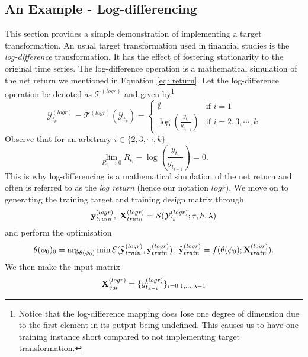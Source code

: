 \subsection{An Example - Log-differencing}\label{subsec: log-diff transformation}
This section provides a simple demonstration of implementing a target transformation. An usual target transformation used in financial studies is the \textit{log-difference} transformation. It has the effect of fostering stationarity to the original time series. The log-difference operation is a mathematical simulation of the net return we mentioned in Equation \ref{eq: return}. Let the log-difference operation be denoted as $\mathcal{T}^{(logr)}$ and given by\footnote{Notice that the log-difference mapping does lose one degree of dimension due to the first element in its output being undefined. This causes us to have one training instance short compared to not implementing target transformation.}
\begin{equation}\label{eq: log-differencing}
    \mathcal{Y}^{(logr)}_{t_k} = \mathcal{T}^{(logr)}(\mathcal{Y}_{t_k}) = \begin{cases}
        \emptyset                  &\text{if $i = 1$} \\
        \log(\frac{y_{t_i}}{y_{t_{i-1}}})  &\text{if $i = 2, 3, \cdots, k$}
    \end{cases}
\end{equation}
Observe that for an arbitrary $i \in \{2, 3, \cdots, k \}$
\begin{equation*}
    \lim_{R_{t_i} \rightarrow 0}{R_{t_i} - \log(\frac{y_{t_i}}{y_{t_{i-1}}}) = 0}.
\end{equation*}
This is why log-differencing is a mathematical simulation of the net return and often is referred to as the \textit{log return} (hence our notation $logr$). We move on to generating the training target and training design matrix through
\begin{equation*}
    \mathbf{y}^{(logr)}_{train}, \; \mathbf{X}^{(logr)}_{train} = \mathcal{S}(\mathcal{Y}^{(logr)}_{t_k}; \tau, h, \lambda)
\end{equation*}
and perform the optimisation
\begin{equation*}
    \theta(\phi_0)_0 = \arg_{\theta(\phi_0)} \min \mathcal{E}(\widehat{\mathbf{y}}^{(logr)}_{train}, \mathbf{y}^{(logr)}_{train}), \; \widehat{\mathbf{y}}^{(logr)}_{train} = f(\theta(\phi_0); \mathbf{X}^{(logr)}_{train}).
\end{equation*}
We then make the input matrix
\begin{equation*}
    \mathbf{X}^{(logr)}_{val} = \{y^{(logr)}_{t_{k-i}} \}_{i = 0, 1, \ldots, \lambda-1}
\end{equation*}
